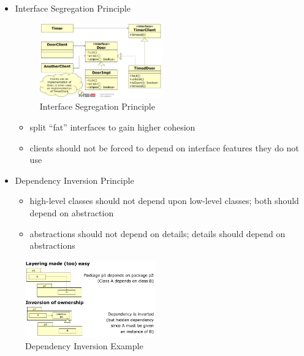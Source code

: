 \begin{itemize}
\tightlist
\item
  Interface Segregation Principle
\begin{figure}[H]
\centering
\includegraphics[width=0.5\textwidth]{figures/InterfaceSegregationPrinciple.PNG}
\caption{Interface Segregation Principle}
\end{figure}

  \begin{itemize}
  \tightlist
  \item
    split ``fat'' interfaces to gain higher cohesion
  \item
    clients should not be forced to depend on interface features they do
    not use
  \end{itemize}
\item
  Dependency Inversion Principle

  \begin{itemize}
  \tightlist
  \item
    high-level classes should not depend upon low-level classes; both
    should depend on abstraction
  \item
    abstractions should not depend on details; details should depend on
    abstractions
  \end{itemize}
\end{itemize}

\begin{figure}[H]
\centering
\includegraphics[width=0.5\textwidth]{figures/dipexample.png}
\caption{Dependency Inversion Example}
\end{figure}

\clearpage